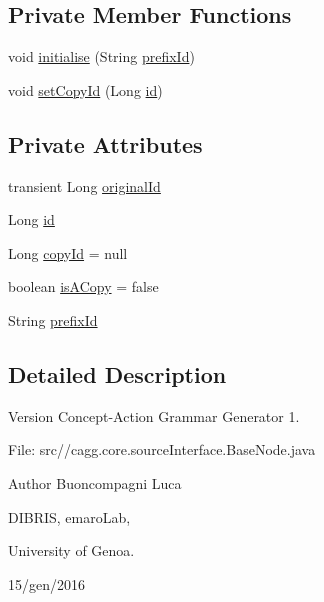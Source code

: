 \subsection*{Private Member Functions}
\begin{DoxyCompactItemize}
\item 
void \hyperlink{classit_1_1emarolab_1_1cagg_1_1core_1_1BaseNode_ad8d73b94319bf906047a748e7c31a931}{initialise} (String \hyperlink{classit_1_1emarolab_1_1cagg_1_1core_1_1BaseNode_a1e4662066a1e580f3ef9a1ad7c483dd8}{prefix\-Id})
\item 
void \hyperlink{classit_1_1emarolab_1_1cagg_1_1core_1_1BaseNode_a233616587a719d76c5bd5efabde15016}{set\-Copy\-Id} (Long \hyperlink{classit_1_1emarolab_1_1cagg_1_1core_1_1BaseNode_ace8dafa005681888ca194c9f02e6f9cf}{id})
\end{DoxyCompactItemize}
\subsection*{Private Attributes}
\begin{DoxyCompactItemize}
\item 
transient Long \hyperlink{classit_1_1emarolab_1_1cagg_1_1core_1_1BaseNode_a6a3d93e1d8a6fa71aeded8749347da7c}{original\-Id}
\item 
Long \hyperlink{classit_1_1emarolab_1_1cagg_1_1core_1_1BaseNode_ace8dafa005681888ca194c9f02e6f9cf}{id}
\item 
Long \hyperlink{classit_1_1emarolab_1_1cagg_1_1core_1_1BaseNode_a526a32f2f2efacaf0a701e8d9b8d387c}{copy\-Id} = null
\item 
boolean \hyperlink{classit_1_1emarolab_1_1cagg_1_1core_1_1BaseNode_a9c661847e680bebcd0f7cd59f88ea4a1}{is\-A\-Copy} = false
\item 
String \hyperlink{classit_1_1emarolab_1_1cagg_1_1core_1_1BaseNode_a1e4662066a1e580f3ef9a1ad7c483dd8}{prefix\-Id}
\end{DoxyCompactItemize}


\subsection{Detailed Description}
\begin{DoxyVersion}{Version}
Concept-\/\-Action Grammar Generator 1. \par
 File\-: src//cagg.core.\-source\-Interface.\-Base\-Node.\-java \par

\end{DoxyVersion}
\begin{DoxyAuthor}{Author}
Buoncompagni Luca \par
 D\-I\-B\-R\-I\-S, emaro\-Lab,\par
 University of Genoa. \par
 15/gen/2016 \par

\end{DoxyAuthor}



